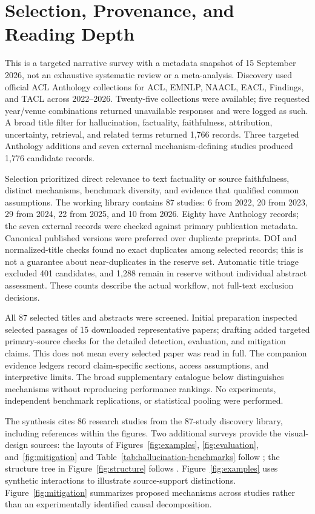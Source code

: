 \section{Selection, Provenance, and Reading Depth}\label{app:selection}
This is a targeted narrative survey with a metadata snapshot of 15 September 2026, not an exhaustive systematic review or a meta-analysis. Discovery used official ACL Anthology collections for ACL, EMNLP, NAACL, EACL, Findings, and TACL across 2022--2026. Twenty-five collections were available; five requested year/venue combinations returned unavailable responses and were logged as such. A broad title filter for hallucination, factuality, faithfulness, attribution, uncertainty, retrieval, and related terms returned 1,766 records. Three targeted Anthology additions and seven external mechanism-defining studies produced 1,776 candidate records.

Selection prioritized direct relevance to text factuality or source faithfulness, distinct mechanisms, benchmark diversity, and evidence that qualified common assumptions. The working library contains 87 studies: 6 from 2022, 20 from 2023, 29 from 2024, 22 from 2025, and 10 from 2026. Eighty have Anthology records; the seven external records were checked against primary publication metadata. Canonical published versions were preferred over duplicate preprints. DOI and normalized-title checks found no exact duplicates among selected records; this is not a guarantee about near-duplicates in the reserve set. Automatic title triage excluded 401 candidates, and 1,288 remain in reserve without individual abstract assessment. These counts describe the actual workflow, not full-text exclusion decisions.

All 87 selected titles and abstracts were screened. Initial preparation inspected selected passages of 15 downloaded representative papers; drafting added targeted primary-source checks for the detailed detection, evaluation, and mitigation claims. This does not mean every selected paper was read in full. The companion evidence ledgers record claim-specific sections, access assumptions, and interpretive limits. The broad supplementary catalogue below distinguishes mechanisms without reproducing performance rankings. No experiments, independent benchmark replications, or statistical pooling were performed.

The synthesis cites 86 research studies from the 87-study discovery library, including references within the figures. Two additional surveys provide the visual-design sources: the layouts of Figures~\ref{fig:examples}, \ref{fig:evaluation}, and~\ref{fig:mitigation} and Table~\ref{tab:hallucination-benchmarks} follow \citet{liu-etal-2024-lvlm-design}; the structure tree in Figure~\ref{fig:structure} follows \citet{liu-etal-2025-logical-design}. Figure~\ref{fig:examples} uses synthetic interactions to illustrate source-support distinctions. Figure~\ref{fig:mitigation} summarizes proposed mechanisms across studies rather than an experimentally identified causal decomposition.

